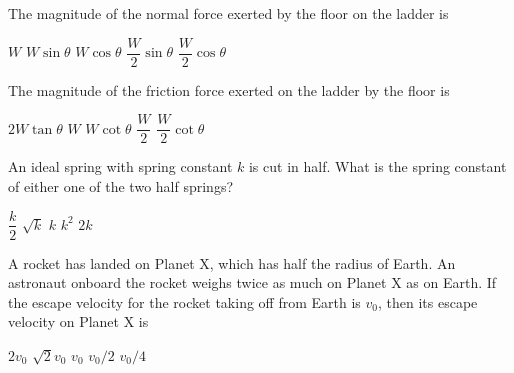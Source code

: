 \documentclass[12pt]{../../oss-classkick-exam}
\begin{document}
\begin{questions}
  \question The magnitude of the normal force exerted by the floor on the ladder
  is
  
  \begin{oneparchoices}
    \choice $W$
    \choice $W\sin\theta$
    \choice $W\cos\theta$
    \choice $\dfrac W2\sin\theta$
    \choice $\dfrac W2\cos\theta$
  \end{oneparchoices}
  \label{ladder1}
  \vspace{.3in}
  
  \question The magnitude of the friction force exerted on the ladder by the
  floor is
  
  \begin{oneparchoices}
    \choice $2W\tan\theta$
    \choice $W$
    \choice $W\cot\theta$
    \choice $\dfrac W2$
    \choice $\dfrac W2\cot\theta$
  \end{oneparchoices}
  \vspace{.3in}
  \label{ladder2}
  
  \question An ideal spring with spring constant $k$ is cut in half. What is the
  spring constant of either one of the two half springs?

  \begin{oneparchoices}
    \choice $\dfrac k2$
    \choice $\sqrt k$
    \choice $k$
    \choice $k^2$
    \choice $2k$
  \end{oneparchoices}
  \vspace{.3in}
  
  \question A rocket has landed on Planet X, which has half the radius of
  Earth. An astronaut onboard the rocket weighs twice as much on Planet X as on
  Earth. If the escape velocity for the rocket taking off from Earth is $v_0$,
  then its escape velocity on Planet X is

  \begin{oneparchoices}
    \choice $2v_0$
    \choice $\sqrt2 v_0$
    \choice $v_0$
    \choice $v_0/2$
    \choice $v_0/4$
  \end{oneparchoices}
  \vspace{.3in}
  
  \begin{center}
  \end{center}
  

\end{questions}
\end{document}
